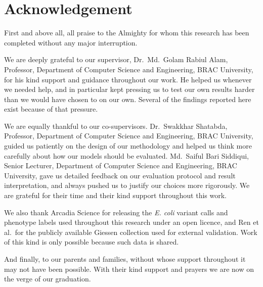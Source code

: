 \section*{Acknowledgement}
\setlength{\parskip}{1em}

First and above all, all praise to the Almighty for whom this research has been
completed without any major interruption.

We are deeply grateful to our supervisor, Dr.\ Md.\ Golam Rabiul Alam, Professor,
Department of Computer Science and Engineering, BRAC University, for his kind
support and guidance throughout our work. He helped us whenever we needed help,
and in particular kept pressing us to test our own results harder than we would
have chosen to on our own. Several of the findings reported here exist because of
that pressure.

We are equally thankful to our co-supervisors. Dr.\ Swakkhar Shatabda, Professor,
Department of Computer Science and Engineering, BRAC University, guided us
patiently on the design of our methodology and helped us think more carefully
about how our models should be evaluated. Md.\ Saiful Bari Siddiqui, Senior
Lecturer, Department of Computer Science and Engineering, BRAC University, gave
us detailed feedback on our evaluation protocol and result interpretation, and
always pushed us to justify our choices more rigorously. We are grateful for
their time and their kind support throughout this work.

We also thank Arcadia Science for releasing the \textit{E. coli} variant calls
and phenotype labels used throughout this research under an open licence, and Ren
et al.\ for the publicly available Giessen collection used for external
validation. Work of this kind is only possible because such data is shared.

And finally, to our parents and families, without whose support throughout it
may not have been possible. With their kind support and prayers we are now on
the verge of our graduation.

\vspace{1em}